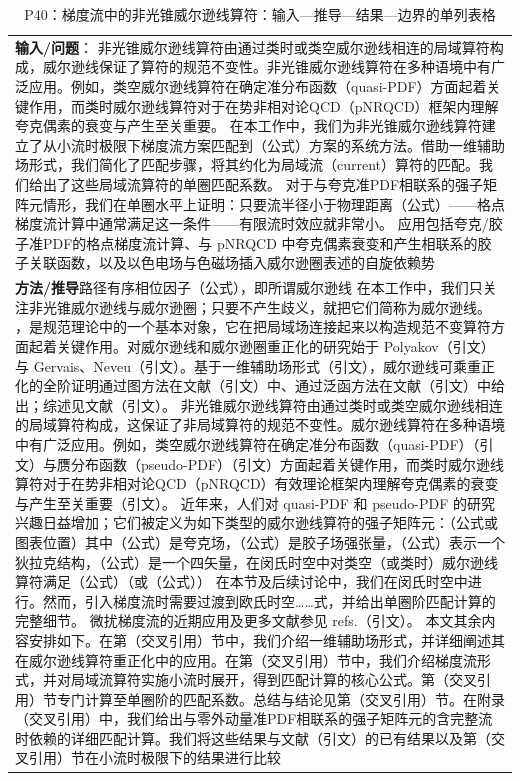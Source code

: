 \documentclass[UTF8,11pt,oneside]{ctexbook}
\begin{document}
\begin{table}[htbp]
  \centering
  \caption*{P40：梯度流中的非光锥威尔逊线算符：输入—推导—结果—边界的单列表格}
  \small
  \begin{tabular}{@{}p{}@{}}
    \toprule
    \textbf{输入/问题}\quad ： 非光锥威尔逊线算符由通过类时或类空威尔逊线相连的局域算符构成，威尔逊线保证了算符的规范不变性。非光锥威尔逊线算符在多种语境中有广泛应用。例如，类空威尔逊线算符在确定准分布函数（quasi-PDF）方面起着关键作用，而类时威尔逊线算符对于在势非相对论QCD（pNRQCD）框架内理解夸克偶素的衰变与产生至关重要。 在本工作中，我们为非光锥威尔逊线算符建立了从小流时极限下梯度流方案匹配到（公式）方案的系统方法。借助一维辅助场形式，我们简化了匹配步骤，将其约化为局域流（current）算符的匹配。我们给出了这些局域流算符的单圈匹配系数。 对于与夸克准PDF相联系的强子矩阵元情形，我们在单圈水平上证明：只要流半径小于物理距离（公式）——格点梯度流计算中通常满足这一条件——有限流时效应就非常小。 应用包括夸克/胶子准PDF的格点梯度流计算、与 pNRQCD 中夸克偶素衰变和产生相联系的胶子关联函数，以及以色电场与色磁场插入威尔逊圈表述的自旋依赖势 \\
    \textbf{方法/推导}\quad 路径有序相位因子（公式），即所谓威尔逊线 在本工作中，我们只关注非光锥威尔逊线与威尔逊圈；只要不产生歧义，就把它们简称为威尔逊线。 ，是规范理论中的一个基本对象，它在把局域场连接起来以构造规范不变算符方面起着关键作用。对威尔逊线和威尔逊圈重正化的研究始于 Polyakov（引文）与 Gervais、Neveu（引文）。基于一维辅助场形式（引文），威尔逊线可乘重正化的全阶证明通过图方法在文献（引文）中、通过泛函方法在文献（引文）中给出；综述见文献（引文）。 非光锥威尔逊线算符由通过类时或类空威尔逊线相连的局域算符构成，这保证了非局域算符的规范不变性。威尔逊线算符在多种语境中有广泛应用。例如，类空威尔逊线算符在确定准分布函数（quasi-PDF）（引文）与赝分布函数（pseudo-PDF）（引文）方面起着关键作用，而类时威尔逊线算符对于在势非相对论QCD（pNRQCD）有效理论框架内理解夸克偶素的衰变与产生至关重要（引文）。 近年来，人们对 quasi-PDF 和 pseudo-PDF 的研究兴趣日益增加；它们被定义为如下类型的威尔逊线算符的强子矩阵元：（公式或图表位置）其中（公式）是夸克场，（公式）是胶子场强张量，（公式）表示一个狄拉克结构，（公式）是一个四矢量，在闵氏时空中对类空（或类时）威尔逊线算符满足（公式）（或（公式）） 在本节及后续讨论中，我们在闵氏时空中进行。然而，引入梯度流时需要过渡到欧氏时空……式，并给出单圈阶匹配计算的完整细节。 微扰梯度流的近期应用及更多文献参见 refs.（引文）。 本文其余内容安排如下。在第（交叉引用）节中，我们介绍一维辅助场形式，并详细阐述其在威尔逊线算符重正化中的应用。在第（交叉引用）节中，我们介绍梯度流形式，并对局域流算符实施小流时展开，得到匹配计算的核心公式。第（交叉引用）节专门计算至单圈阶的匹配系数。总结与结论见第（交叉引用）节。在附录（交叉引用）中，我们给出与零外动量准PDF相联系的强子矩阵元的含完整流时依赖的详细匹配计算。我们将这些结果与文献（引文）的已有结果以及第（交叉引用）节在小流时极限下的结果进行比较 \\

\end{tabular}
\end{table}
\end{document}
